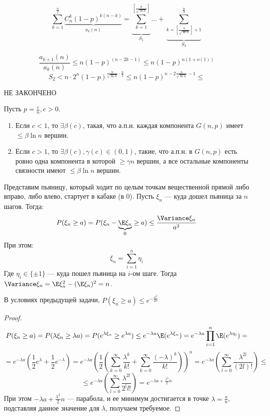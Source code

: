 
\[\sum_{k=1}^\frac{n}{2} \underbrace{C_n^k (1-p)^{k(n-k)}}_{a_k(n)} = \underbrace{\sum_{k=1}^{[\frac{n}{\sqrt{\ln{n}}}]}}_{S_1} \dots + \underbrace{\sum_{k = [\frac{n}{\sqrt{\ln{n}}}] + 1}^{\frac{n}{2}}}_{S_2}\]

\[\frac{a_{k+1}(n)}{a_k(n)} \le n (1-p)^{(n-2k-1)} \le n(1-p)^{n(1 + o(1))}\]
\[S_2 < n \cdot 2^n (1 - p)^{\frac{n}{\sqrt{\ln{n}}} \cdot \frac{n}{2}} \le n(1 - p)^{n - 2\frac{n}{\sqrt{\ln{n}}} - 1}  \le \]

НЕ ЗАКОНЧЕНО

\begin{theorem}
    Пусть \(p = \frac{c}{n}, c > 0\).
    \begin{enumerate}
        \item Если \(c < 1\), то \(\exists \beta(c)\), такая, что а.п.н. каждая компонента \(G(n, p)\) имеет \(\le \beta \ln n\) вершин.
        \item Если \(c > 1\), то \(\exists \beta(c), \gamma(c) \in (0, 1)\), такие, что а.п.н. в \(G(n, p)\) есть ровно одна компонента в которой \(\ge \gamma n\) вершин, а все остальные компоненты связности имеют \(\le \beta \ln n\) вершин.
    \end{enumerate}
\end{theorem}

Представим пьяницу, который ходит по целым точкам вещественной прямой либо вправо, либо влево, стартует в кабаке (в 0). Пусть \(\xi_n\) --- куда дошел пьяница за \(n\) шагов. Тогда:
\[P(\xi_n \ge a) = P(\xi_n - \underbrace{\E \xi_n}_{0} \ge a) \le \frac{\Variance \xi_n}{a^2}\]
При этом:
\[\xi_n = \sum_{i = 1}^n \eta_i\]
Где \(\eta_i \in \{\pm 1\}\) --- куда пошел пьяница на \(i\)-ом шаге. Тогда \(\Variance \xi_n = \E\xi_n^2 - (\E\xi_n)^2 = n\).

\begin{proposition}
    В условиях предыдущей задачи, \(P(\xi_n \ge a) \le e^{-\frac{a^2}{2n}}\)
\end{proposition}
\begin{proof}
    \[P(\xi_n \ge a) = P(\lambda\xi_n \ge \lambda a) = P(e^{\lambda \xi_n} \ge e^{\lambda a}) \le e^{-\lambda a}\E (e^{\lambda \xi_n}) = e^{-\lambda a} \prod_{i = 1}^n \E (e^{\lambda \eta_i}) = \]
    \[= e^{-\lambda a} \left( \frac{1}{2}e^\lambda + \frac{1}{2}e^{-\lambda} \right) = e^{-\lambda a}\left( \frac{1}{2}\left( \sum_{k = 0}^\infty \frac{\lambda^k}{k!} + \sum_{k = 0}^\infty \frac{(-\lambda)^k}{k!} \right) \right)^n = e^{-\lambda a} \left( \sum_{l = 0}^\infty \frac{\lambda^{2l}}{(2l)!} \right) \le \]
    \[\le e^{-\lambda a} \left( \sum_{l = 0}^\infty \frac{\lambda^{2l}}{2^ll!} \right) = e^{-\lambda a + \frac{\lambda^2}{2}n}\]
    При этом \(-\lambda a + \frac{\lambda^2}{2}n\) --- парабола, и ее минимум достигается в точке \(\lambda = \frac{a}{n}\), подставляя данное значение для \(\lambda\), получаем требуемое.
\end{proof}

